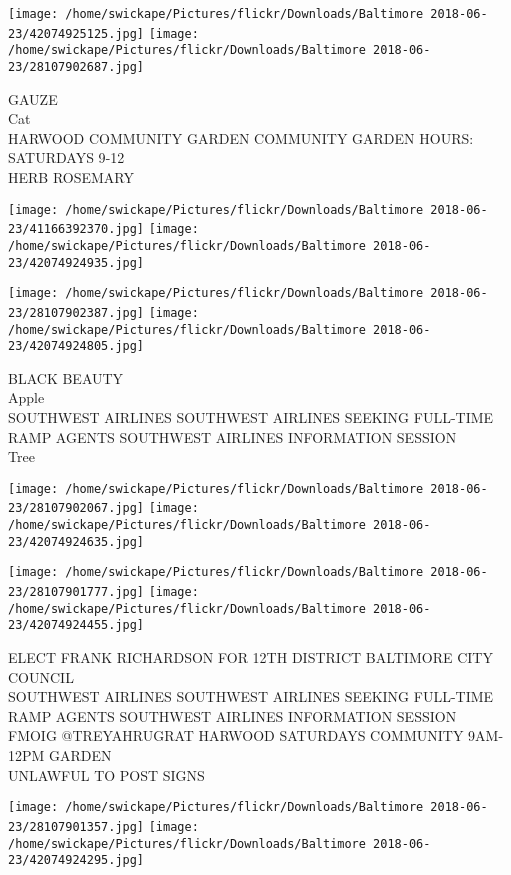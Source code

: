 \documentclass[10pt,letterpaper]{article}
\begin{document}
\texttt{[image: /home/swickape/Pictures/flickr/Downloads/Baltimore 2018-06-23/42074925125.jpg]}
\texttt{[image: /home/swickape/Pictures/flickr/Downloads/Baltimore 2018-06-23/28107902687.jpg]}

GAUZE\\
Cat\\
HARWOOD COMMUNITY GARDEN COMMUNITY GARDEN HOURS: SATURDAYS 9{-}12\\
HERB ROSEMARY\\
\pagebreak

\texttt{[image: /home/swickape/Pictures/flickr/Downloads/Baltimore 2018-06-23/41166392370.jpg]}
\texttt{[image: /home/swickape/Pictures/flickr/Downloads/Baltimore 2018-06-23/42074924935.jpg]}

\texttt{[image: /home/swickape/Pictures/flickr/Downloads/Baltimore 2018-06-23/28107902387.jpg]}
\texttt{[image: /home/swickape/Pictures/flickr/Downloads/Baltimore 2018-06-23/42074924805.jpg]}

BLACK BEAUTY\\
Apple\\
SOUTHWEST AIRLINES SOUTHWEST AIRLINES SEEKING FULL{-}TIME RAMP AGENTS SOUTHWEST AIRLINES INFORMATION SESSION\\
Tree\\
\pagebreak

\texttt{[image: /home/swickape/Pictures/flickr/Downloads/Baltimore 2018-06-23/28107902067.jpg]}
\texttt{[image: /home/swickape/Pictures/flickr/Downloads/Baltimore 2018-06-23/42074924635.jpg]}

\texttt{[image: /home/swickape/Pictures/flickr/Downloads/Baltimore 2018-06-23/28107901777.jpg]}
\texttt{[image: /home/swickape/Pictures/flickr/Downloads/Baltimore 2018-06-23/42074924455.jpg]}

ELECT FRANK RICHARDSON FOR 12TH DISTRICT BALTIMORE CITY COUNCIL\\
SOUTHWEST AIRLINES SOUTHWEST AIRLINES SEEKING FULL{-}TIME RAMP AGENTS SOUTHWEST AIRLINES INFORMATION SESSION\\
FMOIG @TREYAHRUGRAT HARWOOD SATURDAYS COMMUNITY 9AM{-}12PM GARDEN\\
UNLAWFUL TO POST SIGNS\\
\pagebreak

\texttt{[image: /home/swickape/Pictures/flickr/Downloads/Baltimore 2018-06-23/28107901357.jpg]}
\texttt{[image: /home/swickape/Pictures/flickr/Downloads/Baltimore 2018-06-23/42074924295.jpg]}
\end{document}
